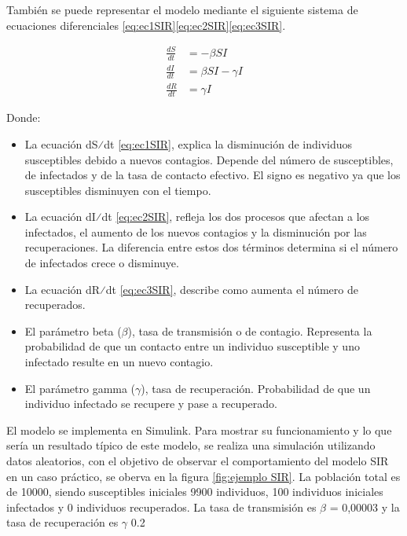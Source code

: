 También se puede representar el modelo mediante el siguiente sistema de ecuaciones diferenciales \eqref{eq:ec1SIR}\eqref{eq:ec2SIR}\eqref{eq:ec3SIR}.

\begin{align}
\frac{dS}{dt} &= -\beta SI \label{eq:ec1SIR} \\
\frac{dI}{dt} &= \beta SI - \gamma I \label{eq:ec2SIR} \\
\frac{dR}{dt} &= \gamma I \label{eq:ec3SIR}
\end{align}

Donde:
\begin{itemize}
    \item 	La ecuación dS⁄dt \eqref{eq:ec1SIR}, explica la disminución de individuos susceptibles debido a nuevos contagios. Depende del número de susceptibles, de infectados y de la tasa de contacto efectivo. El signo es negativo ya que los susceptibles disminuyen con el tiempo.
    \item 	La ecuación dI⁄dt \eqref{eq:ec2SIR}, refleja los dos procesos que afectan a los infectados, el aumento de los nuevos contagios y la disminución por las recuperaciones. La diferencia entre estos dos términos determina si el número de infectados crece o disminuye.
    \item 	La ecuación dR⁄dt \eqref{eq:ec3SIR}, describe como aumenta el número de recuperados. 
    \item El parámetro beta ($\beta$), tasa de transmisión o de contagio. Representa la probabilidad de que un contacto entre un individuo susceptible y uno infectado resulte en un nuevo contagio.
    \item 	El parámetro gamma ($\gamma$), tasa de recuperación. Probabilidad de que un individuo infectado se recupere y pase a recuperado.
\end{itemize}





El modelo se implementa en Simulink. Para mostrar su funcionamiento y lo que sería un resultado típico de este modelo, se realiza una simulación utilizando datos aleatorios, con el objetivo de observar el comportamiento del modelo SIR en un caso práctico, se oberva en la figura \ref{fig:ejemplo SIR}. La población total es de 10000, siendo susceptibles iniciales 9900 individuos, 100 individuos iniciales infectados y 0 individuos recuperados.
La tasa de transmisión es $\beta$ = 0,00003 y la tasa de recuperación es $\gamma$ 0.2



